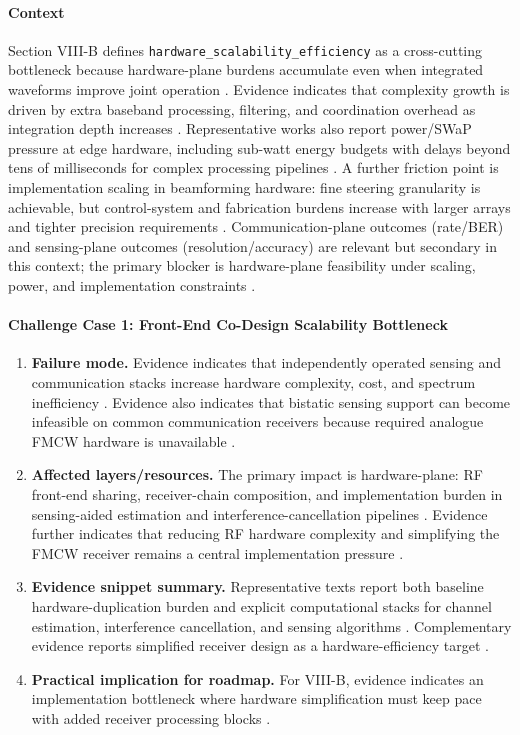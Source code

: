 \documentclass[lettersize,journal]{IEEEtran}
\begin{document}
\paragraph{Context}
Section VIII-B defines \texttt{hardware\_scalability\_efficiency} as a cross-cutting bottleneck because hardware-plane burdens accumulate even when integrated waveforms improve joint operation \cite{O_ISAC_035, O_ISAC_162}. Evidence indicates that complexity growth is driven by extra baseband processing, filtering, and coordination overhead as integration depth increases \cite{O_ISAC_162}. Representative works also report power/SWaP pressure at edge hardware, including sub-watt energy budgets with delays beyond tens of milliseconds for complex processing pipelines \cite{O_ISAC_093}. A further friction point is implementation scaling in beamforming hardware: fine steering granularity is achievable, but control-system and fabrication burdens increase with larger arrays and tighter precision requirements \cite{O_ISAC_171}. Communication-plane outcomes (rate/BER) and sensing-plane outcomes (resolution/accuracy) are relevant but secondary in this context; the primary blocker is hardware-plane feasibility under scaling, power, and implementation constraints \cite{O_ISAC_093, O_ISAC_162, O_ISAC_171}.

\paragraph{Challenge Case 1: Front-End Co-Design Scalability Bottleneck}
\begin{enumerate}
    \item \textbf{Failure mode.} Evidence indicates that independently operated sensing and communication stacks increase hardware complexity, cost, and spectrum inefficiency \cite{O_ISAC_237}. Evidence also indicates that bistatic sensing support can become infeasible on common communication receivers because required analogue FMCW hardware is unavailable \cite{O_ISAC_237}.
    \item \textbf{Affected layers/resources.} The primary impact is hardware-plane: RF front-end sharing, receiver-chain composition, and implementation burden in sensing-aided estimation and interference-cancellation pipelines \cite{O_ISAC_237}. Evidence further indicates that reducing RF hardware complexity and simplifying the FMCW receiver remains a central implementation pressure \cite{O_ISAC_035}.
    \item \textbf{Evidence snippet summary.} Representative texts report both baseline hardware-duplication burden and explicit computational stacks for channel estimation, interference cancellation, and sensing algorithms \cite{O_ISAC_237}. Complementary evidence reports simplified receiver design as a hardware-efficiency target \cite{O_ISAC_035}.
    \item \textbf{Practical implication for roadmap.} For VIII-B, evidence indicates an implementation bottleneck where hardware simplification must keep pace with added receiver processing blocks \cite{O_ISAC_237, O_ISAC_035}.
\end{enumerate}
\end{document}
